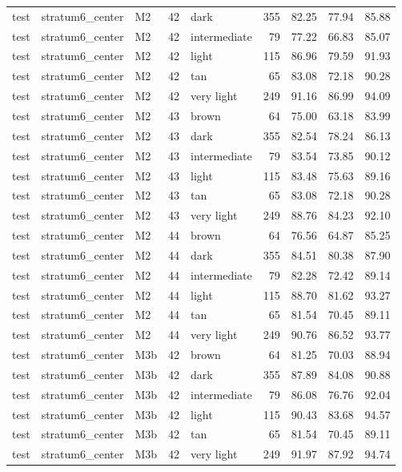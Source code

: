 \begin{tabular}{lllrlrrrr}
test & stratum6\_center & M2 & 42 & dark & 355 & 82.25 & 77.94 & 85.88 \\
test & stratum6\_center & M2 & 42 & intermediate & 79 & 77.22 & 66.83 & 85.07 \\
test & stratum6\_center & M2 & 42 & light & 115 & 86.96 & 79.59 & 91.93 \\
test & stratum6\_center & M2 & 42 & tan & 65 & 83.08 & 72.18 & 90.28 \\
test & stratum6\_center & M2 & 42 & very light & 249 & 91.16 & 86.99 & 94.09 \\
test & stratum6\_center & M2 & 43 & brown & 64 & 75.00 & 63.18 & 83.99 \\
test & stratum6\_center & M2 & 43 & dark & 355 & 82.54 & 78.24 & 86.13 \\
test & stratum6\_center & M2 & 43 & intermediate & 79 & 83.54 & 73.85 & 90.12 \\
test & stratum6\_center & M2 & 43 & light & 115 & 83.48 & 75.63 & 89.16 \\
test & stratum6\_center & M2 & 43 & tan & 65 & 83.08 & 72.18 & 90.28 \\
test & stratum6\_center & M2 & 43 & very light & 249 & 88.76 & 84.23 & 92.10 \\
test & stratum6\_center & M2 & 44 & brown & 64 & 76.56 & 64.87 & 85.25 \\
test & stratum6\_center & M2 & 44 & dark & 355 & 84.51 & 80.38 & 87.90 \\
test & stratum6\_center & M2 & 44 & intermediate & 79 & 82.28 & 72.42 & 89.14 \\
test & stratum6\_center & M2 & 44 & light & 115 & 88.70 & 81.62 & 93.27 \\
test & stratum6\_center & M2 & 44 & tan & 65 & 81.54 & 70.45 & 89.11 \\
test & stratum6\_center & M2 & 44 & very light & 249 & 90.76 & 86.52 & 93.77 \\
test & stratum6\_center & M3b & 42 & brown & 64 & 81.25 & 70.03 & 88.94 \\
test & stratum6\_center & M3b & 42 & dark & 355 & 87.89 & 84.08 & 90.88 \\
test & stratum6\_center & M3b & 42 & intermediate & 79 & 86.08 & 76.76 & 92.04 \\
test & stratum6\_center & M3b & 42 & light & 115 & 90.43 & 83.68 & 94.57 \\
test & stratum6\_center & M3b & 42 & tan & 65 & 81.54 & 70.45 & 89.11 \\
test & stratum6\_center & M3b & 42 & very light & 249 & 91.97 & 87.92 & 94.74 \\

\end{tabular}
